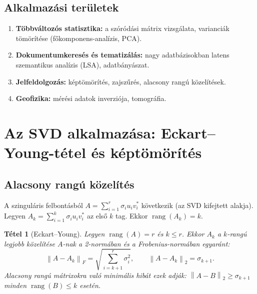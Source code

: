 \documentclass[a4paper,12pt]{article}
\theoremstyle{mydef}
\newtheorem{tetel}{Tétel}[section]
\newcommand{\norm}[1]{\left\|#1\right\|}
\DeclareMathOperator{\rang}{rang}
\begin{document}
\subsection*{Alkalmazási területek}

\begin{enumerate}[noitemsep,topsep=2pt]
  \item \textbf{Többváltozós statisztika:} a szóródási mátrix vizsgálata, varianciák tömörítése
        (főkomponens-analízis, PCA).
  \item \textbf{Dokumentumkeresés és tematizálás:} nagy adatbázisokban latens szemantikus
        analízis (LSA), adatbányászat.
  \item \textbf{Jelfeldolgozás:} képtömörítés, zajszűrés, alacsony rangú közelítések.
  \item \textbf{Geofizika:} mérési adatok inverziója, tomográfia.
\end{enumerate}

\section{Az SVD alkalmazása: Eckart--Young-tétel és képtömörítés}
\label{sec:eckartyoung}

\subsection*{Alacsony rangú közelítés}

A szinguláris felbontásból $A = \sum_{i=1}^r \sigma_i u_i v_i^*$ következik
(az SVD kifejtett alakja). Legyen $A_k = \sum_{i=1}^k \sigma_i u_i v_i^*$ az első $k$ tag.
Ekkor $\rang(A_k) = k$.

\begin{mdframed}[backgroundcolor=thmbg,linewidth=0pt,innertopmargin=8pt,innerbottommargin=8pt]
\begin{tetel}[Eckart--Young]
\label{tetel:ey}
Legyen $\rang(A) = r$ és $k \le r$. Ekkor $A_k$ a $k$-rangú legjobb közelítése
$A$-nak a 2-normában \emph{és} a Frobenius-normában egyaránt:
\[
  \norm{A - A_k}_F = \sqrt{\sum_{i=k+1}^r \sigma_i^2}, \qquad
  \norm{A - A_k}_2 = \sigma_{k+1}.
\]
Alacsony rangú mátrixokra való minimális hibát ezek adják:
$\norm{A - B}_2 \ge \sigma_{k+1}$ minden $\rang(B) \le k$ esetén.
\end{tetel}
\end{mdframed}
\end{document}
